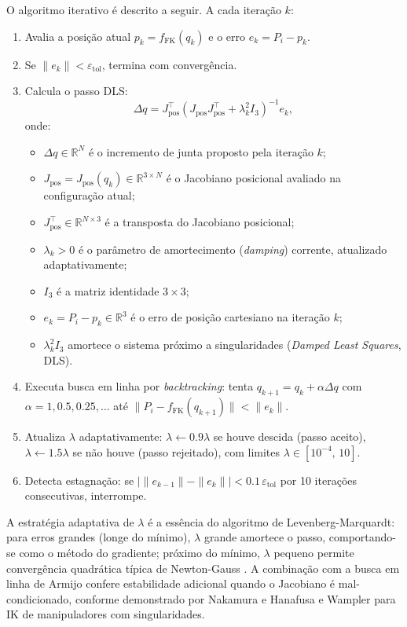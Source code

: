 O algoritmo iterativo é descrito a seguir. A cada iteração $k$:
\begin{enumerate}
    \item Avalia a posição atual $p_k = f_{\text{FK}}(q_k)$ e o erro $e_k = P_i - p_k$.
    \item Se $\|e_k\| < \varepsilon_{\text{tol}}$, termina com convergência.
    \item Calcula o passo DLS:
    \begin{equation}
        \Delta q = J_{\text{pos}}^\top \left(J_{\text{pos}} J_{\text{pos}}^\top + \lambda_k^2 I_3\right)^{-1} e_k,
        \label{eq:lm_step}
    \end{equation}
    onde:
    \begin{itemize}
        \item $\Delta q \in \mathbb{R}^N$ é o incremento de junta proposto pela iteração $k$;
        \item $J_{\text{pos}} = J_{\text{pos}}(q_k) \in \mathbb{R}^{3 \times N}$ é o Jacobiano posicional avaliado na configuração atual;
        \item $J_{\text{pos}}^\top \in \mathbb{R}^{N \times 3}$ é a transposta do Jacobiano posicional;
        \item $\lambda_k > 0$ é o parâmetro de amortecimento (\textit{damping}) corrente, atualizado adaptativamente;
        \item $I_3$ é a matriz identidade $3 \times 3$;
        \item $e_k = P_i - p_k \in \mathbb{R}^3$ é o erro de posição cartesiano na iteração $k$;
        \item $\lambda_k^2 I_3$ amortece o sistema próximo a singularidades (\textit{Damped Least Squares}, DLS).
    \end{itemize}
    \item Executa busca em linha por \textit{backtracking}: tenta $q_{k+1} = q_k + \alpha \Delta q$ com $\alpha = 1, 0.5, 0.25, \ldots$ até $\|P_i - f_{\text{FK}}(q_{k+1})\| < \|e_k\|$.
    \item Atualiza $\lambda$ adaptativamente: $\lambda \leftarrow 0.9\lambda$ se houve descida (passo aceito), $\lambda \leftarrow 1.5\lambda$ se não houve (passo rejeitado), com limites $\lambda \in [10^{-4},\, 10]$.
    \item Detecta estagnação: se $|\|e_{k-1}\| - \|e_k\|| < 0.1\,\varepsilon_{\text{tol}}$ por 10 iterações consecutivas, interrompe.
\end{enumerate}

A estratégia adaptativa de $\lambda$ é a essência do algoritmo de Levenberg-Marquardt: para erros grandes (longe do mínimo), $\lambda$ grande amortece o passo, comportando-se como o método do gradiente; próximo do mínimo, $\lambda$ pequeno permite convergência quadrática típica de Newton-Gauss \cite{more2006levenberg}. A combinação com a busca em linha de Armijo confere estabilidade adicional quando o Jacobiano é mal-condicionado, conforme demonstrado por Nakamura e Hanafusa \cite{nakamura1986inverse} e Wampler \cite{wampler2007manipulator} para IK de manipuladores com singularidades.

